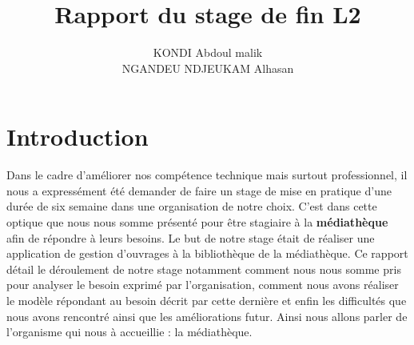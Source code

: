 \documentclass[14pt,a4paper]{article}
\author{KONDI Abdoul malik \\ NGANDEU NDJEUKAM Alhasan}
\title{Rapport du stage de fin L2}
\begin{document}
\maketitle
\tableofcontents
\newpage

\section{Introduction}
Dans le cadre d'améliorer nos compétence technique mais surtout professionnel, il nous a expressément été demander de faire un stage de mise en pratique d'une durée de six semaine dans une organisation de notre choix. C'est dans cette optique que nous nous somme présenté pour être stagiaire à la \textbf{médiathèque} afin de répondre à leurs besoins.
Le but de notre stage était de réaliser une application de gestion d'ouvrages à la  bibliothèque de la médiathèque.
Ce rapport détail le déroulement de notre stage notamment comment nous nous somme pris pour analyser le besoin exprimé par l'organisation, comment nous avons réaliser le modèle répondant au besoin décrit par cette dernière et enfin les difficultés que nous avons rencontré ainsi que les améliorations futur. Ainsi nous allons parler de l'organisme qui nous à accueillie : la médiathèque.
\end{document}
